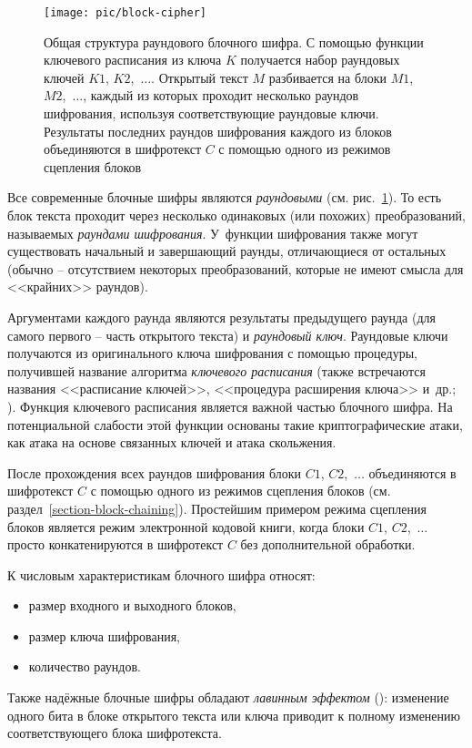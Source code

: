 \begin{figure}[!b]
	\centering
	\texttt{[image: pic/block-cipher]}
  \caption{Общая структура раундового блочного шифра. С помощью функции ключевого расписания из ключа $K$ получается набор раундовых ключей $K1$, $K2$,~$\dots$. Открытый текст $M$ разбивается на блоки $M1$, $M2$,~$\dots$, каждый из которых проходит несколько раундов шифрования, используя соответствующие раундовые ключи. Результаты последних раундов шифрования каждого из блоков объединяются в шифротекст $C$ с помощью одного из режимов сцепления блоков}
  \label{fig:block-cipher}
\end{figure}

Все современные блочные шифры являются \emph{раундовыми} (см. рис.~\ref{fig:block-cipher}). То есть блок текста проходит через несколько одинаковых (или похожих) преобразований, называемых \emph{раундами шифрования}. У~функции шифрования также могут существовать начальный и завершающий раунды, отличающиеся от остальных (обычно -- отсутствием некоторых преобразований, которые не имеют смысла для <<крайних>> раундов).

Аргументами каждого раунда являются результаты предыдущего раунда (для самого первого -- часть открытого текста) и \emph{раундовый ключ}. Раундовые ключи получаются из оригинального ключа шифрования с помощью процедуры, получившей название алгоритма \emph{ключевого расписания} (также встречаются названия <<расписание ключей>>, <<процедура расширения ключа>> и~др.; ). Функция ключевого расписания является важной частью блочного шифра. На потенциальной слабости этой функции основаны такие криптографические атаки, как атака на основе связанных ключей и атака скольжения.

После прохождения всех раундов шифрования блоки $C1$, $C2$,~$\dots$ объединяются в шифротекст $C$ с помощью одного из режимов сцепления блоков (см. раздел~\ref{section-block-chaining}). Простейшим примером режима сцепления блоков является режим электронной кодовой книги, когда блоки $C1$, $C2$,~$\dots$ просто конкатенируются в шифротекст $C$ без дополнительной обработки.

К числовым характеристикам блочного шифра относят:
\begin{itemize}
	\item размер входного и выходного блоков,
	\item размер ключа шифрования,
	\item количество раундов.
\end{itemize}

Также надёжные блочные шифры обладают \emph{лавинным эффектом} (): изменение одного бита в блоке открытого текста или ключа приводит к полному изменению соответствующего блока шифротекста.
